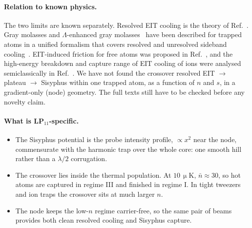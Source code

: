 \documentclass[11pt,a4paper]{article}
\newcommand{\micro}{\upmu}
\newcommand{\SI}[2]{\ensuremath{#1\,\mathrm{#2}}}
\begin{document}
\paragraph{Relation to known physics.} The two limits are known separately. Resolved EIT cooling is the theory of Ref.~\cite{morigi2000}. Gray molasses and $\Lambda$-enhanced gray molasses~\cite{grynberg1994,weidemuller1994} have been described for trapped atoms in a unified formalism that covers resolved and unresolved sideband cooling~\cite{phatak2024}. EIT-induced friction for free atoms was proposed in Ref.~\cite{he2017}, and the high-energy breakdown and capture range of EIT cooling of ions were analysed semiclassically in Ref.~\cite{bartolotta2024}. We have not found the crossover resolved EIT $\to$ plateau $\to$ Sisyphus within one trapped atom, as a function of $n$ and $s$, in a gradient-only (node) geometry. The full texts still have to be checked before any novelty claim.

\paragraph{What is LP$_{11}$-specific.}
\begin{itemize}
\item The Sisyphus potential is the probe intensity profile, $\propto x^2$ near the node, commensurate with the harmonic trap over the whole core: one smooth hill rather than a $\lambda/2$ corrugation.
\item The crossover lies inside the thermal population. At \SI{10}{\micro K}, $\bar n\approx30$, so hot atoms are captured in regime III and finished in regime I. In tight tweezers and ion traps the crossover sits at much larger $n$.
\item The node keeps the low-$n$ regime carrier-free, so the same pair of beams provides both clean resolved cooling and Sisyphus capture.
\end{itemize}

\end{document}

